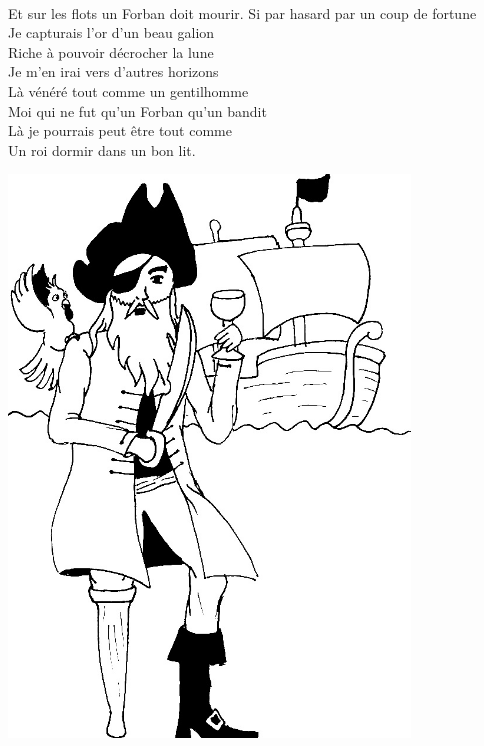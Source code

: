 \\Et sur les flots un Forban doit mourir.
\breakpage
Si par hasard par un coup de fortune
\\Je capturais l'or d'un beau galion
\\Riche à pouvoir décrocher la lune
\\Je m'en irai vers d'autres horizons
\\Là vénéré tout comme un gentilhomme
\\Moi qui ne fut qu'un Forban qu'un bandit
\\Là je pourrais peut être tout comme
\\Un roi dormir dans un bon lit.
\\
\begin{center}
\includegraphics[width=0.8\textwidth]{images/chant_corsaire.jpg}
\end{center}

\breakpage